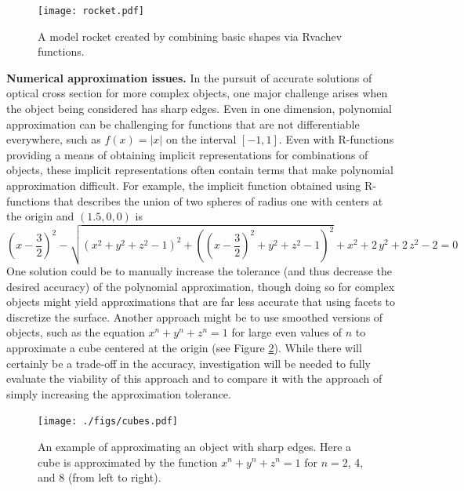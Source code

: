 \documentclass[11pt,reqno]{amsart}
\theoremstyle{definition}
\begin{document}
\begin{figure} 
\centerline{\texttt{[image: rocket.pdf]}} 
\caption{A model rocket created by combining basic shapes via Rvachev
functions.}
\label{fig:rocket} 
\end{figure} 

\textbf{Numerical approximation issues.}
In the pursuit of accurate solutions of optical cross section for more complex
objects, one major challenge arises when the object being considered has sharp
edges. Even in one dimension, polynomial approximation can be challenging for
functions that are not differentiable everywhere, such as $f(x) = |x|$ on the
interval $[-1,1]$. Even with R-functions providing a means of obtaining
implicit representations for combinations of objects, these implicit
representations often contain terms that make polynomial approximation
difficult. For example, the implicit function obtained using R-functions that
describes the union of two spheres of radius one with centers at the origin and
$(1.5,0,0)$ is
\[{\left(x-\frac{3}{2}\right)}^2-\sqrt{{\left(x^2+y^2+z^2-1\right)}^2+{\left({\left(x-\frac{3}{2}\right)}^2+y^2+z^2-1\right)}^2}+x^2+2\,y^2+2\,z^2-2 = 0
\]
One solution could be to manually increase the tolerance (and thus decrease the
desired accuracy) of the polynomial approximation, though doing so for complex
objects might yield approximations that are far less accurate that using facets
to discretize the surface. Another approach might be to use smoothed versions
of objects, such as the equation $x^n + y^n + z^n = 1$ for large even values of
$n$ to approximate a cube centered at the origin (see Figure \ref{cubes}).
While there will certainly be a trade-off in the accuracy, investigation will
be needed to fully evaluate the viability of this approach and to compare it
with the approach of simply increasing the approximation tolerance.

\begin{figure}[H]
\texttt{[image: ./figs/cubes.pdf]}
\caption{An example of approximating an object with sharp edges. Here a cube is approximated by the function $x^n + y^n + z^n = 1$ for $n = 2$, 4, and 8 (from left to right).}
\label{cubes}
\end{figure}
\end{document}
